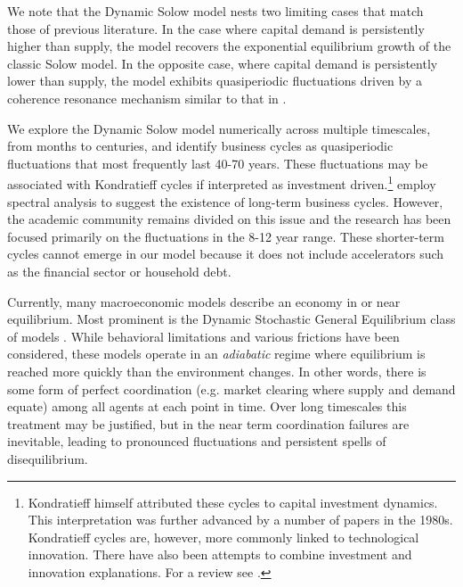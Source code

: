 \documentclass[authoryear, review]{elsarticle}
\begin{document}

We note that the Dynamic Solow model nests two limiting cases that match those of previous literature. In the case where capital demand is persistently higher than supply, the model recovers the exponential equilibrium growth of the classic Solow model. In the opposite case, where capital demand is persistently lower than supply, the model exhibits quasiperiodic fluctuations driven by a coherence resonance mechanism similar to that in \citet{KroujilineEtAl2019}.

We explore the Dynamic Solow model numerically across multiple timescales, from months to centuries, and identify business cycles as quasiperiodic fluctuations that most frequently last 40-70 years. These fluctuations may be associated with Kondratieff cycles if interpreted as investment driven.\footnote{Kondratieff himself attributed these cycles to capital investment dynamics. This interpretation was further advanced by a number of papers in the 1980s. Kondratieff cycles are, however, more commonly linked to technological innovation. There have also been attempts to combine investment and innovation explanations. For a review see \citet{KorotayevTsirel2010}.}
\citet{KorotayevTsirel2010} employ spectral analysis to suggest the existence of long-term business cycles. However, the academic community remains divided on this issue and the research has been focused primarily on the fluctuations in the 8-12 year range. These shorter-term cycles cannot emerge in our model because it does not include accelerators such as the financial sector or household debt.

Currently, many macroeconomic models describe an economy in or near equilibrium. Most prominent is the Dynamic Stochastic General Equilibrium class of models \citep[see][for recent reviews]{ChristianoEtAl2018, KaplanViolante2018}. While behavioral limitations and various frictions have been considered, these models operate in an \textit{adiabatic} regime where equilibrium is reached more quickly than the environment changes. In other words, there is some form of perfect coordination (e.g. market clearing where supply and demand equate) among all agents at each point in time. Over long timescales this treatment may be justified, but in the near term coordination failures are inevitable, leading to pronounced fluctuations and persistent spells of disequilibrium. 
 
\end{document}
